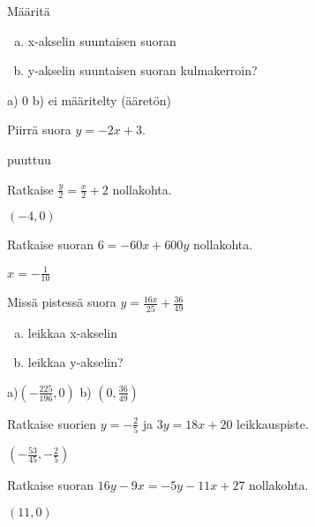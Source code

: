 \begin{tehtava}
Määritä
\begin{enumerate}[a)]
\item x-akselin suuntaisen suoran
\item y-akselin suuntaisen suoran kulmakerroin?
\end{enumerate}
\begin{vastaus}
a) $0$ b) ei määritelty (ääretön)
\end{vastaus}
\end{tehtava}

\begin{tehtava}
Piirrä suora $y=-2x+3$.
\begin{vastaus}
puuttuu
\end{vastaus}
\end{tehtava}

\begin{tehtava}
Ratkaise $\frac{y}{2}=\frac{x}{2}+2$ nollakohta.
\begin{vastaus}
$(-4,0)$
\end{vastaus}
\end{tehtava}

\begin{tehtava}
Ratkaise suoran $6=-60x+600y$ nollakohta. 
\begin{vastaus}
$x=-\frac{1}{10}$
\end{vastaus}
\end{tehtava}

\begin{tehtava}
Missä pistessä suora $y=\frac{16x}{25}+\frac{36}{49}$ 
\begin{enumerate}[a)]
\item leikkaa x-akselin
\item leikkaa y-akselin?
\end{enumerate}
\begin{vastaus}
a)$(-\frac{225}{196},0)$ b) $(0,\frac{36}{49})$
\end{vastaus}
\end{tehtava}

\begin{tehtava}
Ratkaise suorien $y=-\frac{2}{5}$ ja $3y=18x+20$ leikkauspiste.
\begin{vastaus}
$(-\frac{53}{45},-\frac{2}{5})$
\end{vastaus}
\end{tehtava}

\begin{tehtava}
Ratkaise suoran $16y-9x=-5y-11x+27$ nollakohta. 
\begin{vastaus}
$(11,0)$
\end{vastaus}
\end{tehtava}

